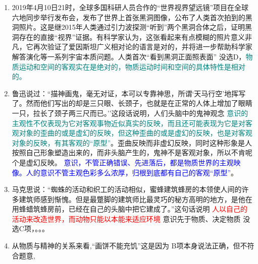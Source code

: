 \begin{enumerate}[align=hang, start=1]
	
	\item 
	2019年4月10日21时，全球多国科研人员合作的``世界视界望远镜''项目在全球六地同步举行发布会，发布了世界上首张黑洞图像，公布了人类首次拍到的黑洞照片。这是继2015年人类通过引力波探测``听到''两个黑洞合体之后，证明黑洞存在的直接``视界''证据。有科学家认为，这张看起来有点模糊的照片意义非凡，它再次验证了爱因斯坦广义相对论的语言是对的，并将进一步帮助科学家解答演化等一系列宇宙本质问题。人类首次``看到黑洞正面照表面'' 
	\note 没选D，\textcolor{teal}{物质运动和空间的客观实在是绝对的，物质运动时间和空间的具体特性是相对的。}
	\item 鲁迅说过：``描神画鬼，毫无对证，本可以专靠神思，所谓`天马行空'地挥写了。然而他们写出的却是三只眼、长颈子，也就是在正常的人体上增加了眼睛一只，拉长了颈子两三尺而已。''这段话说明，人们头脑中的鬼神观念
	\note  \textcolor{teal}{意识的主观性不仅表现为它对客观事物近似真实的反映，而且还可能表现为它是对客观对象的歪曲的或是虚幻的反映，但这种歪曲的或是虚幻的反映，也是对客观对象的反映，有其客观的``原型''}。歪曲反映而非虚幻反映，同时这种形象是人按照自己形象塑造出来的，而非头脑产生的，鬼神不是客观对象，所以不肯呢个是虚幻反映。
	\textcolor{blue}{意识，不管正确错误、先进落后，都是物质世界的主观映像。人的意识不管主观色彩多么浓厚，归根到底都有自己的客观``原型''}。
	
	
	\item 
	马克思说：``蜘蛛的活动和织工的活动相似，蜜蜂建筑蜂房的本领使人间的许多建筑师感到惭愧。但是最蹩脚的建筑师比最灵巧的秘方高明的地方，是他在用蜂蜡筑蜂房前，已经在自己的头脑中把它建成了。''这句话说明
	\xx   {\textcolor{red}{主观能动性是人区别于动物的特征}}{	\textcolor{red}{ 人的时间活动是有意识、有目的的 } }  
	{\textcolor{red}{人以自己的活动来改造世界，而动物只能以本能来适应环境 } }  {意识先于物质、决定物质}	
	\note 没选C项，。。。
	
	
	\item 
	从物质与精神的关系来看,``画饼不能充饥''这是因为
	\note B项本身说法正确，但不符合题意,
	

\end{enumerate}
